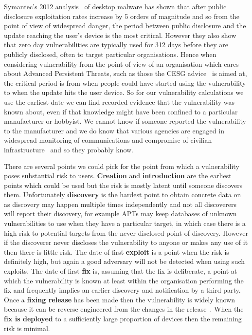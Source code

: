 \documentclass[conference,a4paper,twoside]{IEEEtran}
\begin{document}
Symantec's 2012 analysis~\cite{Bilge2012} of desktop malware has shown that after public disclosure exploitation rates increase by 5 orders of magnitude and so from the point of view of widespread danger, the period between public disclosure and the update reaching the user's device is the most critical.
However they also show that zero day vulnerabilities are typically used for 312 days before they are publicly disclosed, often to target particular organisations.
Hence when considering vulnerability from the point of view of an organisation which cares about Advanced Persistent Threats, such as those the CESG advice~\cite{CESG2013} is aimed at, the critical period is from when people could have started using the vulnerability to when the update hits the user device.
So for our vulnerability calculations we use the earliest date we can find recorded evidence that the vulnerability was known about, even if that knowledge might have been confined to a particular manufacturer or hobbyist.
We cannot know if someone reported the vulnerability to the manufacturer and we do know that various agencies are engaged in widespread monitoring of communications and compromise of civilian infrastructure~\cite{TODO} and so they probably know.

There are several points we could pick for the point from which a vulnerability poses substantial risk to users.
{\bf Creation} and {\bf introduction} are the earliest points which could be used but the risk is mostly latent until someone discovers them.
Unfortunately {\bf discovery} is the hardest point to obtain concrete data on as discovery may happen multiple times independently and not all discoverers will report their discovery, for example APTs may keep databases of unknown vulnerabilities to use when they have a particular target, in which case there is a high risk to potential targets from the never disclosed point of discovery.
However if the discoverer never discloses the vulnerability to anyone or makes any use of it then there is little risk.
The date of first {\bf exploit} is a point when the risk is definitely high, but again a good adversary will not be detected when using such exploits.
The date of first {\bf fix} is, assuming that the fix is deliberate, a point at which the vulnerability is known at least within the organisation performing the fix and frequently implies an earlier discovery and notification by a third party.
Once a {\bf fixing release} has been made then the vulnerability is widely known because it can be reverse engineered from the changes in the release~\cite{Brumley2008}.
When the {\bf fix is deployed} to a sufficiently large proportion of devices then the remaining risk is minimal.
\end{document}
